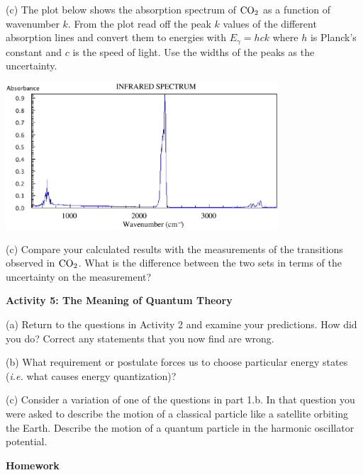 (c) The plot below shows the absorption spectrum of $\rm CO_2$ as a function of wavenumber $k$.
From the plot read off the peak $k$ values of the different absorption lines and convert them to energies 
with $E_\gamma = hck$ where $h$ is Planck's constant and $c$ is the speed of light.
Use the widths of the peaks as the uncertainty.

\includegraphics[width=4.0in]{solveSE/CO2absorption1.eps}

\vspace{1.5cm}

(c) Compare your calculated results with the measurements of the transitions observed in $\rm CO_2$. 
What is the difference between the two sets in terms of the uncertainty on the measurement?
\vspace{2.5cm}


\textbf{Activity 5: The Meaning of Quantum Theory}

(a)  Return to the questions in Activity 2 and examine your predictions.
How did you do?
Correct any statements that you now find are wrong.
\vspace{2.0cm}

(b) What requirement or postulate forces us to choose particular energy states
({\it i.e.} what causes energy quantization)?
\vspace{2.0cm}


(c) Consider a variation of one of the questions in part 1.b.
In that question you were asked to describe the motion of a classical particle
like a satellite orbiting the Earth.
Describe the motion of a quantum particle in the harmonic oscillator potential.
\vspace{3.0cm}

\newpage

\textbf{Homework}

